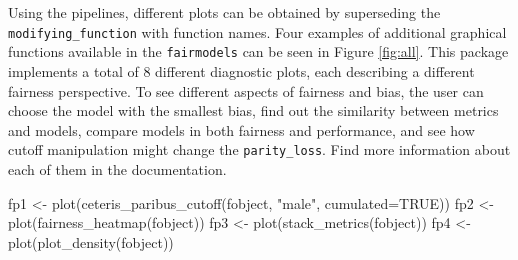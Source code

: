Using the pipelines, different plots can be obtained by superseding the
\texttt{modifying\_function} with function names. Four examples of
additional graphical functions available in the \texttt{fairmodels} can
be seen in Figure \ref{fig:all}. This package implements a total of 8
different diagnostic plots, each describing a different fairness
perspective. To see different aspects of fairness and bias, the user can
choose the model with the smallest bias, find out the similarity between
metrics and models, compare models in both fairness and performance, and
see how cutoff manipulation might change the \texttt{parity\_loss}. Find
more information about each of them in the documentation.

\begin{Schunk}
\begin{Sinput}
fp1  <- plot(ceteris_paribus_cutoff(fobject, "male", cumulated=TRUE))
fp2  <- plot(fairness_heatmap(fobject))
fp3  <- plot(stack_metrics(fobject))
fp4  <- plot(plot_density(fobject))
\end{Sinput}
\end{Schunk}

